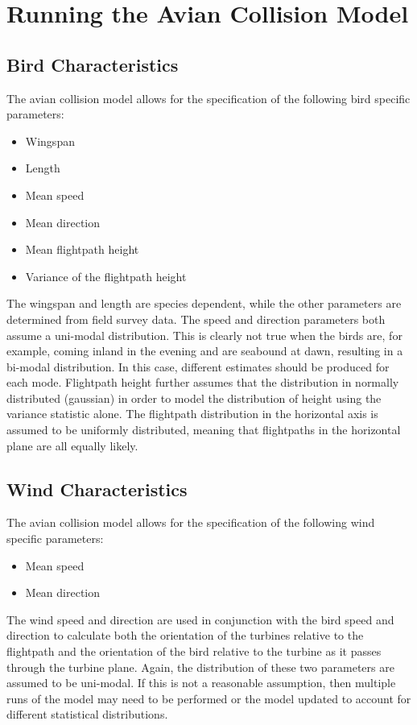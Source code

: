 \documentclass[11pt,letterpaper,openany]{report}
\begin{document}
\chapter{Running the Avian Collision Model}
\section{Bird Characteristics}
The avian collision model allows for the specification of the following bird specific parameters:
\begin{itemize}
  \item Wingspan
  \item Length
  \item Mean speed
  \item Mean direction
  \item Mean flightpath height
  \item Variance of the flightpath height
\end{itemize}
The wingspan and length are species dependent, while the other parameters are determined from field survey data. The
speed and direction parameters both assume a uni-modal distribution. This is clearly not true when the birds are, for
example, coming inland in the evening and are seabound at dawn, resulting in a bi-modal distribution. In this case,
different estimates should be produced for each mode. Flightpath height further assumes that the distribution in
normally distributed (gaussian) in order to model the distribution of height using the variance statistic alone. The
flightpath distribution in the horizontal axis is assumed to be uniformly distributed, meaning that flightpaths in the
horizontal plane are all equally likely.

\section{Wind Characteristics}
The avian collision model allows for the specification of the following wind specific parameters:
\begin{itemize}
  \item Mean speed
  \item Mean direction
\end{itemize}
The wind speed and direction are used in conjunction with the bird speed and direction to calculate both the
orientation of the turbines relative to the flightpath and the orientation of the bird relative to the turbine as it
passes through the turbine plane. Again, the distribution of these two parameters are assumed to be uni-modal. If this
is not a reasonable assumption, then multiple runs of the model may need to be performed or the model updated to
account for different statistical distributions.
\end{document}
